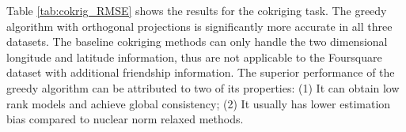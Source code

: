 Table \ref{tab:cokrig_RMSE} shows the  results for the cokriging task. The greedy algorithm with orthogonal projections is significantly more accurate in all three datasets. The baseline cokriging methods can only handle the two dimensional longitude and latitude information, thus are not applicable to the Foursquare dataset with additional friendship information. The superior performance of the greedy algorithm can be attributed to two of its properties: (1) It can obtain low rank models and achieve global consistency;  (2) It usually has lower estimation bias compared to nuclear norm relaxed methods. %



